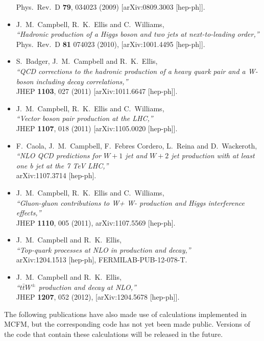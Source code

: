 \documentclass[12pt]{article}
\begin{document}
\begin{itemize}
  Phys.\ Rev.\  D {\bf 79}, 034023 (2009)
  [arXiv:0809.3003 [hep-ph]].
\item J.~M.~Campbell, R.~K.~Ellis and C.~Williams, \\
  {\it ``Hadronic production of a Higgs boson and two jets at next-to-leading order,''} \\
   Phys.\ Rev.\ D {\bf 81} 074023 (2010),
  [arXiv:1001.4495 [hep-ph]].
\item S.~Badger, J.~M.~Campbell and R.~K.~Ellis, \\
  {\it ``QCD corrections to the hadronic production of a heavy quark pair and a  W-boson including decay correlations,''} \\
 JHEP {\bf 1103}, 027 (2011)
  [arXiv:1011.6647 [hep-ph]].
\item J.~M.~Campbell, R.~K.~Ellis and C.~Williams, \\
  {\it ``Vector boson pair production at the LHC,''} \\
  JHEP {\bf 1107}, 018 (2011)
  [arXiv:1105.0020 [hep-ph]]. 
\item F.~Caola, J.~M.~Campbell, F.~Febres Cordero, L.~Reina and D.~Wackeroth, \\
  {\it ``NLO QCD predictions for $W+1$ jet and $W+2$ jet production with at least one b jet at the 7 TeV LHC,''} \\
    arXiv:1107.3714 [hep-ph].
\item J.~M.~Campbell, R.~K.~Ellis and C.~Williams, \\
  {\it ``Gluon-gluon contributions to W+ W- production and Higgs interference effects,''} \\
  JHEP {\bf 1110}, 005 (2011),
  arXiv:1107.5569 [hep-ph].
\item J.~M.~Campbell and R.~K.~Ellis, \\
  {\it ``Top-quark processes at NLO in production and decay,''} \\
  arXiv:1204.1513 [hep-ph], FERMILAB-PUB-12-078-T.
\item J.~M.~Campbell and R.~K.~Ellis, \\
  {\it ``$t \bar{t} W^{\pm}$ production and decay at NLO,''} \\
  JHEP {\bf 1207}, 052 (2012), [arXiv:1204.5678 [hep-ph]].


\end{itemize}

The following publications have also made use of calculations
implemented in MCFM, but the corresponding code has not yet been made
public. Versions of the code that contain these calculations will be
released in the future.
\end{document}
